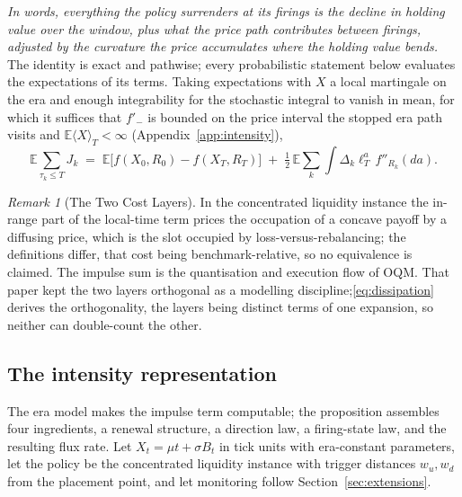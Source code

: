 \documentclass[11pt,a4paper]{article}
\theoremstyle{definition}
\theoremstyle{plain}
\theoremstyle{remark}
\newtheorem{remark}{Remark}
\begin{document}
\emph{In words, everything the policy surrenders at its firings is the decline in holding value over the window, plus what the price path
contributes between firings, adjusted by the curvature the price accumulates where the holding value bends.} The identity is exact and pathwise; every
probabilistic statement below evaluates the expectations of its terms. Taking expectations with $X$ a local martingale on the era and enough integrability for the stochastic
integral to vanish in mean, for which it suffices that $f'_-$ is bounded on the price interval the stopped era path visits and
$\mathbb{E}\langle X \rangle_T < \infty$
(Appendix~\ref{app:intensity}),
\begin{equation}\label{eq:mean}
\mathbb{E} \sum_{\tau_k \le T} J_k
\;=\; \mathbb{E}\big[ f(X_0, R_0) - f(X_T, R_T) \big]
\;+\; \tfrac12\, \mathbb{E} \sum_k \int \Delta_k \ell^a_T\,
f''_{R_k}(da).
\end{equation}

\begin{remark}[The Two Cost Layers]\label{rem:layers}
In the concentrated liquidity instance the in-range part of the local-time term prices the occupation of a concave payoff by a diffusing price, which is the slot occupied by
loss-versus-rebalancing;\cite{milionis2022} the definitions differ, that cost being benchmark-relative, so no equivalence is claimed. The impulse sum is the quantisation and execution flow of OQM. That
paper kept the two layers orthogonal as a modelling discipline;\eqref{eq:dissipation} derives the orthogonality, the layers being
distinct terms of one expansion, so neither can double-count the other.
\end{remark}

\subsection{The intensity representation}\label{sec:intensity}

The era model makes the impulse term computable; the proposition assembles four ingredients, a renewal structure, a direction law, a firing-state law, and the resulting flux rate. 
Let $X_t = \mu t + \sigma B_t$ in tick units with era-constant parameters, let the policy be the concentrated liquidity instance with trigger distances
$w_u, w_d$ from the placement point, and let monitoring follow Section~\ref{sec:extensions}.
\end{document}
